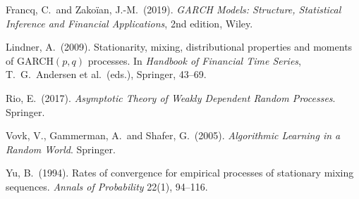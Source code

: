 \documentclass[11pt]{article}
\begin{document}
\begin{description}
\item Francq, C.\ and Zako\"{i}an, J.-M.\ (2019). \emph{GARCH
Models: Structure, Statistical Inference and Financial
Applications}, 2nd edition, Wiley.
\item Lindner, A.\ (2009). Stationarity, mixing, distributional
properties and moments of GARCH$(p,q)$ processes. In \emph{Handbook
of Financial Time Series}, T.~G.~Andersen et al.\ (eds.),
Springer, 43--69.
\item Rio, E.\ (2017). \emph{Asymptotic Theory of Weakly Dependent
Random Processes}. Springer.
\item Vovk, V., Gammerman, A.\ and Shafer, G.\ (2005).
\emph{Algorithmic Learning in a Random World}. Springer.
\item Yu, B.\ (1994). Rates of convergence for empirical
processes of stationary mixing sequences. \emph{Annals of
Probability} 22(1), 94--116.
\end{description}
\end{document}
